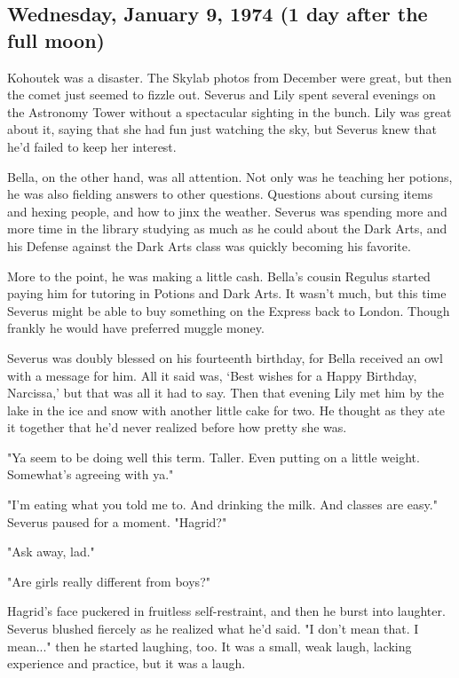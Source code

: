 \documentclass[a4paper,11pt]{article}
\begin{document}
\subsection{Wednesday, January 9, 1974 (1 day after the full moon)}

Kohoutek was a disaster. The Skylab photos from December were great, but then the comet just seemed to fizzle out. Severus and Lily spent several evenings on the Astronomy Tower without a spectacular sighting in the bunch. Lily was great about it, saying that she had fun just watching the sky, but Severus knew that he'd failed to keep her interest.

Bella, on the other hand, was all attention. Not only was he teaching her potions, he was also fielding answers to other questions. Questions about cursing items and hexing people, and how to jinx the weather. Severus was spending more and more time in the library studying as much as he could about the Dark Arts, and his Defense against the Dark Arts class was quickly becoming his favorite.

More to the point, he was making a little cash. Bella's cousin Regulus started paying him for tutoring in Potions and Dark Arts. It wasn't much, but this time Severus might be able to buy something on the Express back to London. Though frankly he would have preferred muggle money.

Severus was doubly blessed on his fourteenth birthday, for Bella received an owl with a message for him. All it said was, `Best wishes for a Happy Birthday, Narcissa,' but that was all it had to say. Then that evening Lily met him by the lake in the ice and snow with another little cake for two. He thought as they ate it together that he'd never realized before how pretty she was.

"Ya seem to be doing well this term. Taller. Even putting on a little weight. Somewhat's agreeing with ya."

"I'm eating what you told me to. And drinking the milk. And classes are easy." Severus paused for a moment. "Hagrid?"

"Ask away, lad."

"Are girls really different from boys?"

Hagrid's face puckered in fruitless self-restraint, and then he burst into laughter. Severus blushed fiercely as he realized what he'd said. "I don't mean that. I mean..." then he started laughing, too. It was a small, weak laugh, lacking experience and practice, but it was a laugh.
\end{document}
